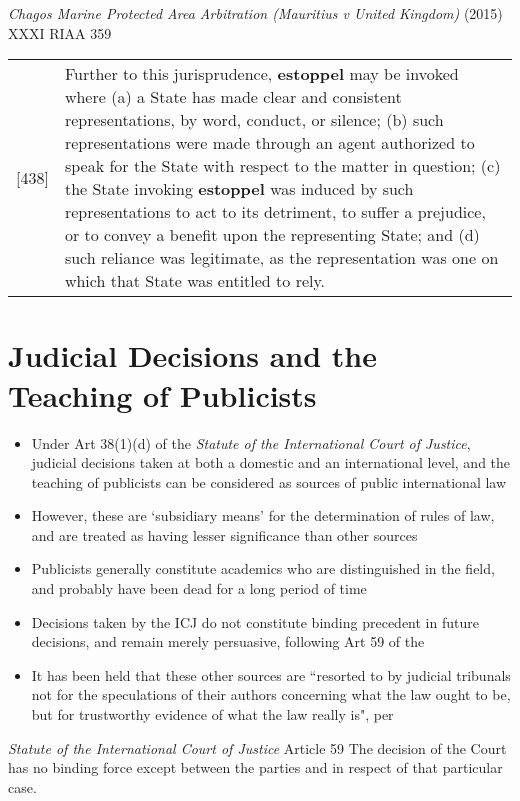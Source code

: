 \begin{casedetails}{\textit{Chagos Marine Protected Area Arbitration (Mauritius v United Kingdom)} (2015) XXXI RIAA 359}
    \begin{longtable}{r|>{\raggedright\arraybackslash}p{}}
        [438] & Further to this jurisprudence, \textbf{estoppel} may be invoked where (a) a State has made clear and consistent representations, by word, conduct, or silence; (b) such representations were made through an agent authorized to speak for the State with respect to the matter in question; (c) the State invoking \textbf{estoppel} was induced by such representations to act to its detriment, to suffer a prejudice, or to convey a benefit upon the representing State; and (d) such reliance was legitimate, as the representation was one on which that State was entitled to rely.
    \end{longtable}  

\end{casedetails}

\section{Judicial Decisions and the Teaching of Publicists}
\begin{itemize}
    \item Under Art 38(1)(d) of the \textit{Statute of the International Court of Justice}, judicial decisions taken at both a domestic and an international level, and the teaching of publicists can be considered as sources of public international law
    \item However, these are `subsidiary means' for the determination of rules of law, and are treated as having lesser significance than other sources
    \item Publicists generally constitute academics who are distinguished in the field, and probably have been dead for a long period of time
    \item Decisions taken by the ICJ do not constitute binding precedent in future decisions, and remain merely persuasive, following Art 59 of the 
    \item It has been held that these other sources are ``resorted to by judicial tribunals not for the speculations of their authors concerning what the law ought to be, but for trustworthy evidence of what the law really is", per 
\end{itemize}
\begin{statutedetails}{\textit{Statute of the International Court of Justice} Article 59}
    \flushleft
    The decision of the Court has no binding force except between the parties and in respect of that particular case.
\end{statutedetails}

